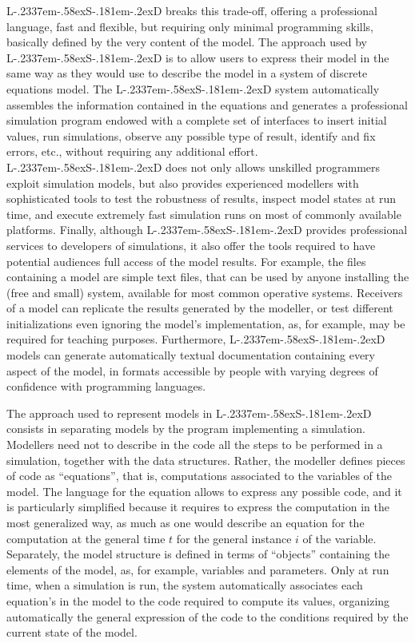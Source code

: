 \documentclass [11pt,a4paper] {book}
\def\LsD{{L\kern-.2337em\lower-.58ex\hbox{S}\kern-.181em\lower-.2ex\hbox{D}}\xspace}
\begin{document}
\LsD breaks this trade-off, offering a professional language, fast and flexible, but requiring only minimal programming skills, basically defined by the very content of the model. The approach used by \LsD is to allow users to express their model in the same way as they would use to describe the model in a system of discrete equations model. The \LsD system automatically assembles the information contained in the equations and generates a professional simulation program endowed with a complete set of interfaces to insert initial values, run simulations, observe any possible type of result, identify and fix errors, etc., without requiring any additional effort. \LsD does not only allows unskilled programmers exploit simulation models, but also provides experienced modellers with sophisticated tools to test the robustness of results, inspect model states at run time, and execute extremely fast simulation runs on most of commonly available platforms. Finally, although \LsD provides professional services to developers of simulations, it also offer the tools required to have potential audiences full access of the model results. For example, the files containing a model are simple text files, that can be used by anyone installing the (free and small) system, available for most common operative systems. Receivers of a model can replicate the results generated by the modeller, or test different initializations even ignoring the model's implementation, as, for example, may be required for teaching purposes. Furthermore, \LsD models can generate automatically textual documentation containing every aspect of the model, in formats accessible  by people with varying degrees of confidence with programming languages.


The approach used to represent models in \LsD consists in separating models by the program implementing a simulation. Modellers need not to describe in the code all the steps to be performed in a simulation, together with the data structures. Rather, the modeller defines pieces of code as ``equations'', that is, computations associated to the variables of the model. The language for the equation allows to express any possible code, and it is particularly simplified because it requires to express the computation in the most generalized way, as much as one would describe an equation for the computation at the general time $t$ for the general instance $i$ of the variable. Separately, the model structure is defined in terms of ``objects'' containing the elements of the model, as, for example, variables and parameters. Only at run time, when a simulation is run, the system automatically associates each equation's in the model to the code required to compute its values, organizing automatically the general expression of the code to the conditions required by the current state of the model.
\end{document}
